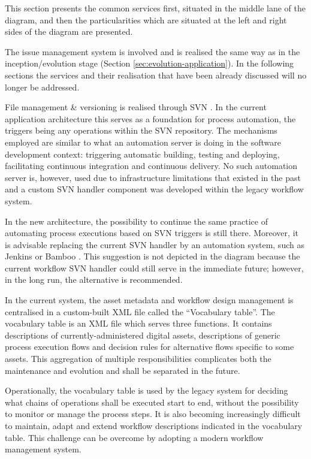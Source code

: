 	This section presents the common services first, situated in the middle lane of the diagram, and then the particularities which are situated at the left and right sides of the diagram are presented. 
	
	The issue management system is involved and is realised the same way as in the inception/evolution stage (Section \ref{sec:evolution-application}). In the following sections the services and their realisation that have been already discussed will no longer be addressed.  
	
	File management \& versioning is realised through SVN \cite{svn}. In the current application architecture this serves as a foundation for process automation, the triggers being any operations within the SVN repository. The mechanisms employed are similar to what an automation server is doing in the software development context: triggering automatic building, testing and deploying, facilitating continuous integration and continuous delivery. No such automation server is, however, used due to infrastructure limitations that existed in the past and a custom SVN handler component was developed within the legacy workflow system. 
	
	\enlargethispage{1em}
	
	In the new architecture, the possibility to continue the same practice of automating process executions based on SVN triggers is still there. Moreover, it is advisable replacing the current SVN handler by an automation system, such as Jenkins \citep{jenkins} or Bamboo \cite{bamboo}. This suggestion is not depicted in the diagram because the current workflow SVN handler could still serve in the immediate future; however, in the long run, the alternative is recommended.
	
	In the current system, the asset metadata and workflow design management is centralised in a custom-built XML file called the ``Vocabulary table''. The vocabulary table is an XML file which serves three functions. It contains descriptions of currently-administered digital assets, descriptions of generic process execution flows and decision rules for alternative flows specific to some assets. This aggregation of multiple responsibilities complicates both the maintenance and evolution and shall be separated in the future. 
	
	Operationally, the vocabulary table is used by the legacy system for deciding what chains of operations shall be executed start to end, without the possibility to monitor or manage the process steps. It is also becoming increasingly difficult to maintain, adapt and extend workflow descriptions indicated in the vocabulary table. This challenge can be overcome by adopting a modern workflow management system. 
	
